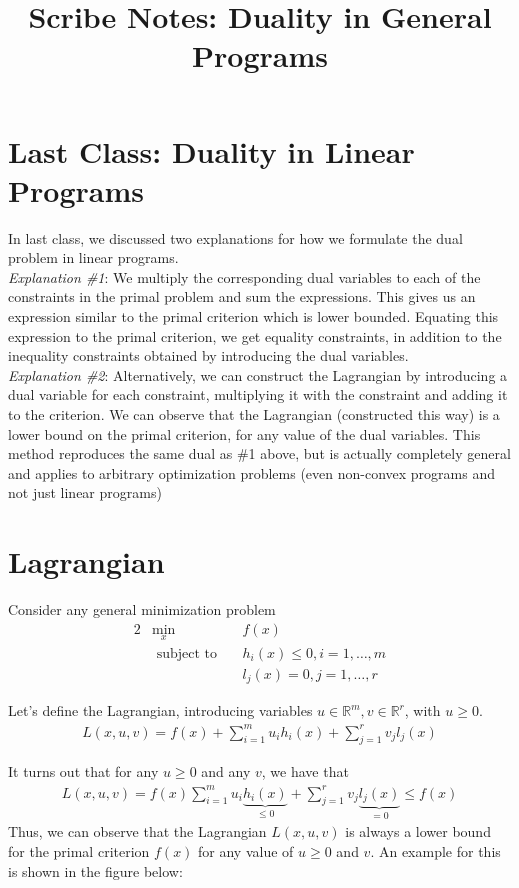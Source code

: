 \documentclass[11pt]{article}
\title{Scribe Notes: Duality in General Programs}
\author{\Name}
\newcommand{\R}{\mathbb{R}}
\begin{document}
\maketitle

\section{Last Class: Duality in Linear Programs}

In last class, we discussed two explanations for how we formulate the dual problem in linear programs.\\
\textit{Explanation \#1}: We multiply the corresponding dual variables to each of the constraints in the primal problem and sum the expressions. This gives us an expression similar to the primal criterion which is lower bounded. Equating this expression to the primal criterion, we get equality constraints, in addition to the inequality constraints obtained by introducing the dual variables. \\
\textit{Explanation \#2}: Alternatively, we can construct the Lagrangian by introducing a dual variable for each constraint, multiplying it with the constraint and adding it to the criterion. We can observe that the Lagrangian (constructed this way) is a lower bound on the primal criterion, for any value of the dual variables. This method reproduces the same dual as \#1 above, but is actually completely general and applies to arbitrary optimization problems (even non-convex programs and not just linear programs)


\section{Lagrangian}

Consider any general minimization problem
\begin{alignat*}{2}
&\min_x &&f(x) \\
&\text{ subject to}&~&h_i(x) \leq 0, i = 1, \dots, m \\
&&&l_j(x) = 0, j = 1, \dots, r
\end{alignat*}

Let's define the Lagrangian, introducing variables $u \in \R^m, v \in \R^r$,
with $u \geq 0$.
\begin{align*}
L(x, u, v) = f(x) + \sum_{i=1}^m u_i h_i(x) + \sum_{j=1}^r v_j l_j(x)
\end{align*}

It turns out that for any $u \geq 0$ and any $v$, we have that
\begin{align*}
L(x, u, v) = f(x) \sum_{i=1}^m u_i \underbrace{h_i(x)}_{\leq 0} + \sum_{j=1}^r v_j \underbrace{l_j(x)}_{=0} \leq f(x)
\end{align*}
Thus, we can observe that the Lagrangian $L(x, u, v)$ is always a lower bound for the primal criterion $f(x)$ for any value of $u \geq 0$ and $v$. An example for this is shown in the figure below:
\end{document}

